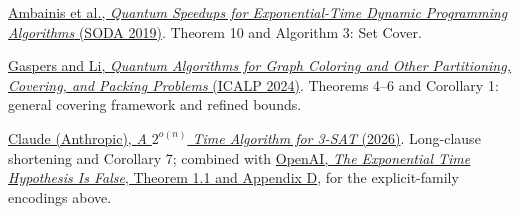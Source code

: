 \documentclass[11pt,a4paper]{article}
\theoremstyle{problemstyle}
\newcommand{\subhead}[1]{\Needspace{4\baselineskip}\par\vspace{5pt}{\bfseries #1\par}\vspace{1pt}}
\newenvironment{algorithmindex}[1]{%
  \begin{enumerate}[label={[#1.\arabic*]},leftmargin=3.4em,labelsep=0.6em,itemsep=4pt,topsep=3pt,parsep=0pt]
  \small
}{\end{enumerate}}
\begin{document}
\subhead{Algorithm}
\begin{algorithmindex}{8}
\item \href{https://arxiv.org/pdf/1807.05209}{Ambainis et al., \emph{Quantum Speedups for Exponential-Time Dynamic Programming Algorithms} (SODA 2019)}. Theorem 10 and Algorithm 3: Set Cover.
\item \href{https://arxiv.org/pdf/2311.08042}{Gaspers and Li, \emph{Quantum Algorithms for Graph Coloring and Other Partitioning, Covering, and Packing Problems} (ICALP 2024)}. Theorems 4--6 and Corollary 1: general covering framework and refined bounds.
\item \href{https://github.com/anthropics/formal-math/tree/main/eth}{Claude (Anthropic), \emph{A $2^{o(n)}$ Time Algorithm for 3-SAT} (2026)}. Long-clause shortening and Corollary 7; combined with \href{https://github.com/openai/math/blob/main/preprints/The-Exponential-Time-Hypothesis-is-False-October-25-2026/paper.pdf}{OpenAI, \emph{The Exponential Time Hypothesis Is False}, Theorem 1.1 and Appendix D}, for the explicit-family encodings above.
\end{algorithmindex}
\end{document}
